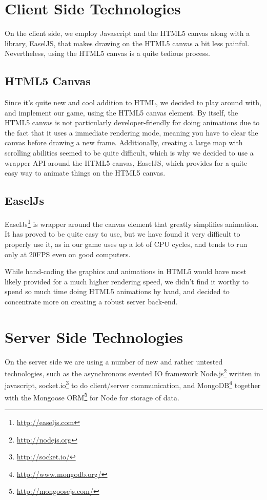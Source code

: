 \documentclass[a4paper,11pt]{article}
\begin{document}
		
	
	\section{Client Side Technologies}
		On the client side, we employ Javascript and the HTML5 canvas along with a library, EaselJS, that makes drawing on the HTML5 canvas a bit less painful. Nevertheless, using the HTML5 canvas is a quite tedious process.
	
		\subsection{HTML5 Canvas}
			Since it's quite new and cool addition to HTML, we decided to play around with, and implement our game, using the HTML5 canvas element. By itself, the HTML5 canvas is not particularly developer-friendly for doing animations due to the fact that it uses a immediate rendering mode, meaning you have to clear the canvas before drawing a new frame. Additionally, creating a large map with scrolling abilities seemed to be quite difficult, which is why we decided to use a wrapper API around the HTML5 canvas, EaselJS, which provides for a quite easy way to animate things on the HTML5 canvas.
			
		\subsection{EaselJs}
			EaselJs\footnote{\url{http://easeljs.com}} is wrapper around the canvas element that greatly simplifies animation. It has proved to be quite easy to use, but we have found it very difficult to properly use it, as in our game uses up a lot of CPU cycles, and tends to run only at 20FPS even on good computers. 
			
			While hand-coding the graphics and animations in HTML5 would have most likely provided for a much higher rendering speed, we didn't find it worthy to spend so much time doing HTML5 animations by hand, and decided to concentrate more on creating a robust server back-end.
					
	\section{Server Side Technologies}
		On the server side we are using a number of new and rather untested technologies, such as the asynchronous evented IO framework Node.js\footnote{\url{http://nodejs.org}} written in javascript, socket.io\footnote{\url{http://socket.io/}} to do client/server communication, and MongoDB\footnote{\url{http://www.mongodb.org/}} together with the Mongoose ORM\footnote{\url{http://mongoosejs.com/}}  for Node for storage of data.
	
\end{document}
